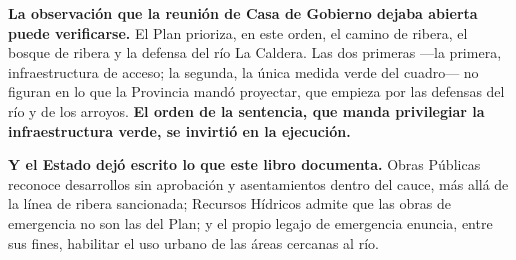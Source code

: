 \begin{cautela}
\textbf{La observación que la reunión de Casa de Gobierno dejaba abierta puede verificarse.} El Plan prioriza, en este orden, el camino de ribera, el bosque de ribera y la defensa del río La Caldera. Las dos primeras ---la primera, infraestructura de acceso; la segunda, la única medida verde del cuadro--- no figuran en lo que la Provincia mandó proyectar, que empieza por las defensas del río y de los arroyos. \textbf{El orden de la sentencia, que manda privilegiar la infraestructura verde, se invirtió en la ejecución.}

\textbf{Y el Estado dejó escrito lo que este libro documenta.} Obras Públicas reconoce desarrollos sin aprobación y asentamientos dentro del cauce, más allá de la línea de ribera sancionada; Recursos Hídricos admite que las obras de emergencia no son las del Plan; y el propio legajo de emergencia enuncia, entre sus fines, habilitar el uso urbano de las áreas cercanas al río.
\end{cautela}


